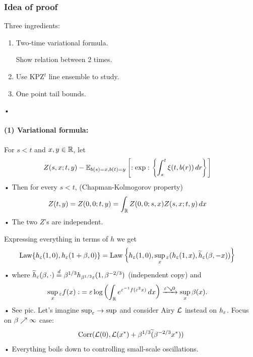 \subsubsection{Idea of proof}

Three ingredients:
\begin{enumerate}
\item
Two-time variational formula. 

Show relation between 2 times. 
\item
Use KPZ$^t$ line ensemble to study.
\item
One point tail bounds.
\end{enumerate}•

\paragraph{(1) Variational formula:} For $s<t$ and $x,y\in \mathbb{R}$, let
\begin{align*}
Z(s,x;t,y) &- \mathbb{E}_{b(s)=x, b(t)=y} \left[ {
:\exp: \left\{ {
\int_s^t \xi(t,b(r))\,dr
} \right\}
} \right]
\end{align*}•
Then for every $s<t$, (Chapman-Kolmogorov property)
\begin{align*}
Z(t,y) &= Z(0,0;t,y) = \int_{\mathbb{R}} Z(0,0;s,x) Z(s,x;t,y) \,dx
\end{align*}•
The two $Z$'s are independent. 

Expressing everything in terms of $h$ we get
\begin{align*}
\text{Law}\{h_\varepsilon(1,0), h_\varepsilon(1+\beta,0)\} &= \text{Law} \left\{ {
h_\varepsilon(1,0),\sup_x {}_\varepsilon(h_\varepsilon(1,x), \widetilde{h}_\varepsilon(\beta,-x))
} \right\}
\end{align*}•
where $\widetilde{h}_\varepsilon(\beta,\cdot)\stackrel d=\beta^{1/3} h_{\beta^{1/3}\varepsilon}(1,\beta^{-2/3})$ (independent copy) and
\begin{align*}
\sup_x{}_\varepsilon f(x) :&= \varepsilon \log\left( {\int_{\mathbb{R}} e^{\varepsilon^{-1}f(\varepsilon^2x)}\,dx} \right)\xrightarrow{\varepsilon\searrow 0} \sup_x \beta(x).
\end{align*}•
See pic.
Let's imagine $\sup_\varepsilon\to \sup$ and consider Airy $\mathcal{L}$ instead on $h_\varepsilon$. Focus on $\beta\nearrow \infty$ case:
\begin{align*}
\operatorname{Corr}(\mathcal{L}(0),\mathcal{L}(x^*)+\beta^{1/3}\widetilde{(}\beta^{-2/3}x^*))
\end{align*}•
Everything boils down to controlling small-scale oscillations.
